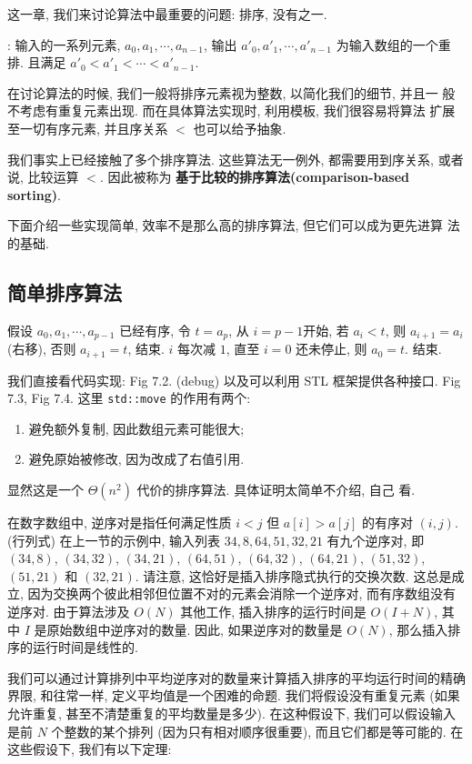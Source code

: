 \documentclass[a4paper]{ctexart}
\theoremstyle{definition}
\theoremstyle{definition}
\begin{document}
这一章, 我们来讨论算法中最重要的问题: 排序, 没有之一. 

 : 输入的一系列元素, $a_0, a_1, \cdots,
a_{n - 1}$, 输出 $a'_0, a'_1, \cdots, a'_{n - 1}$ 为输入数组的一个重排.
且满足 $a'_0 < a'_1 < \cdots < a'_{n - 1}$.

在讨论算法的时候, 我们一般将排序元素视为整数, 以简化我们的细节, 并且一
般不考虑有重复元素出现. 而在具体算法实现时, 利用模板, 我们很容易将算法
扩展至一切有序元素, 并且序关系 $<$ 也可以给予抽象.

我们事实上已经接触了多个排序算法. 这些算法无一例外, 都需要用到序关系,
或者说, 比较运算 $<$. 因此被称为 \textbf{基于比较的排序算法(comparison-based
sorting)}.

下面介绍一些实现简单, 效率不是那么高的排序算法, 但它们可以成为更先进算
法的基础.

\subsection{简单排序算法}

 假设 $a_0, a_1, \cdots, a_{p - 1}$
已经有序, 令 $t = a_{p}$, 从 $i = p - 1$开始, 若 $a_i < t$, 则 $a_{i +
  1} = a_i$(右移), 否则 $a_{i + 1} = t$, 结束.  $i$ 每次减 $1$, 直至 $i = 0$
还未停止, 则 $a_0 = t$. 结束.

我们直接看代码实现: Fig 7.2. (debug) 以及可以利用 STL 框架提供各种接口.
Fig 7.3, Fig 7.4. 这里 \verb|std::move| 的作用有两个: 
\begin{enumerate}
  \item 避免额外复制, 因此数组元素可能很大; 
  \item 避免原始被修改, 因为改成了右值引用. 
\end{enumerate}

显然这是一个 $\Theta(n^2)$ 代价的排序算法. 具体证明太简单不介绍, 自己
看. 

在数字数组中, 逆序对是指任何满足性质 $i < j$ 但 $a[i] > a[j]$ 的有序对 $(i, j)$. 
(行列式) 在上一节的示例中, 输入列表 $34, 8, 64, 51, 32, 21$ 有九个逆序对, 
即 $(34, 8)$, $(34, 32)$, $(34, 21)$, $(64, 51)$, $(64, 32)$, 
$(64, 21)$, $(51, 32)$, $(51, 21)$ 和 $(32, 21)$. 
请注意, 这恰好是插入排序隐式执行的交换次数. 这总是成立, 
因为交换两个彼此相邻但位置不对的元素会消除一个逆序对, 而有序数组没有逆序对. 
由于算法涉及 $O(N)$ 其他工作, 插入排序的运行时间是 $O(I + N)$, 
其中 $I$ 是原始数组中逆序对的数量. 因此, 如果逆序对的数量是 $O(N)$, 
那么插入排序的运行时间是线性的. 

我们可以通过计算排列中平均逆序对的数量来计算插入排序的平均运行时间的精确界限, 
和往常一样, 定义平均值是一个困难的命题. 我们将假设没有重复元素 
(如果允许重复, 甚至不清楚重复的平均数量是多少). 在这种假设下, 
我们可以假设输入是前 $N$ 个整数的某个排列 (因为只有相对顺序很重要), 
而且它们都是等可能的. 在这些假设下, 我们有以下定理:
\end{document}
